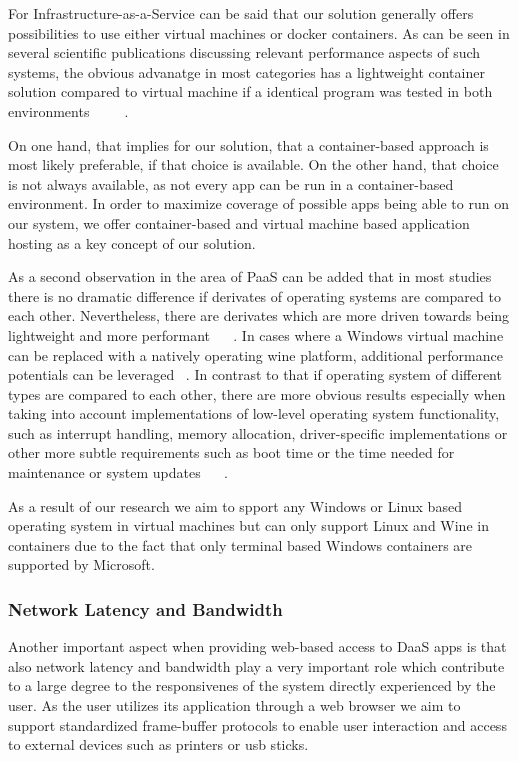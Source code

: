 \documentclass[runningheads]{llncs}
\begin{document}
For Infrastructure-as-a-Service can be said
that our solution generally offers possibilities
to use either virtual machines or docker containers.
As can be seen in several scientific publications
discussing relevant performance aspects of such systems,
the obvious advanatge in most categories
has a lightweight container solution compared to virtual machine
if a identical program was tested in both environments
~\cite{felter2015updated}
~\cite{potdar2020performance}
~\cite{seo2014performance}.

On one hand, that implies for our solution,
that a container-based approach is most likely preferable,
if that choice is available.
On the other hand, that  choice is not always available,
as not every app can be run in a container-based environment.
In order to maximize coverage of possible apps being able to run on our system,
we offer container-based and virtual machine based application hosting
as a key concept of our solution.

As a second observation in the area of PaaS can be added
that in most studies there is no dramatic difference
if derivates of operating systems are compared to each other.
Nevertheless, there are derivates
which are more driven towards being lightweight and more performant
~\cite{boras2020performance}  %
~\cite{balen2020performance}. %
In cases where a Windows virtual machine can be replaced with a natively operating wine platform,
additional performance potentials can be leveraged
~\cite{huang2012performance}.  %
In contrast to that if operating system of different types are compared to each other,
there are more obvious results
especially when taking into account implementations of low-level operating system functionality,
such as interrupt handling, memory allocation, driver-specific implementations
or other more subtle requirements such as boot time
or the time needed for maintenance or system updates
~\cite{sergeev2022docker} %
~\cite{sulaiman2021comparison}. %

As a result of our research we aim to spport
any Windows or Linux based operating system in virtual machines
but can only support Linux and Wine in containers
due to the fact that only terminal based Windows containers are supported by Microsoft.

\subsubsection{Network Latency and Bandwidth}
Another important aspect when providing web-based access to DaaS apps
is that also network latency and bandwidth play a very important role
which contribute to a large degree to the responsivenes of the system
directly experienced by the user.
As the user utilizes its application through a web browser
we aim to support standardized frame-buffer protocols
to enable user interaction and access to external devices such as printers or usb sticks.
\end{document}
